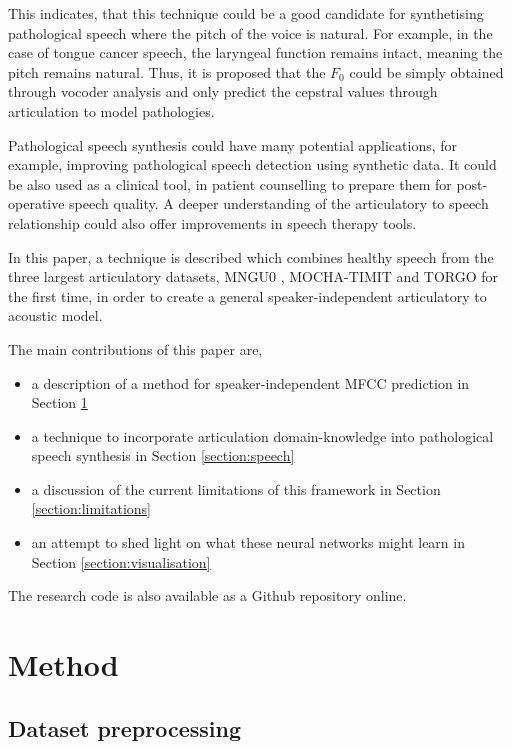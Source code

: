 \documentclass[a4paper]{article}
\begin{document}
This indicates, that this technique could be a good candidate for synthetising
pathological speech where the pitch of the voice is natural. For example,
in the case of tongue cancer speech, the laryngeal function remains intact,
meaning the pitch remains natural. Thus, it is proposed that the \( F_0 \) could
be simply obtained through vocoder analysis and only predict the cepstral
values through articulation to model pathologies.

Pathological speech synthesis could have many potential applications, for example, improving
pathological speech detection using synthetic data. It could be also used as a clinical tool,
in patient counselling to prepare them for post-operative speech quality. A deeper understanding
of the articulatory to speech relationship could also offer improvements in speech therapy tools.

In this paper, a technique is described which combines healthy speech
from the three largest articulatory datasets, MNGU0 \cite{Richmond2011},
MOCHA-TIMIT and TORGO \cite{Rudzicz2012} for the first time, in order to
create a general speaker-independent articulatory to acoustic model.

\vspace{0.5em}
The main contributions of this paper are,
\begin{itemize}
\setlength\itemsep{-0.3em}
\item a description of a method for speaker-independent MFCC prediction in Section \ref{section:method}
\item a technique to incorporate articulation domain-knowledge into pathological
  speech synthesis in Section \ref{section:speech} 
\item a discussion of the current limitations of this framework in Section \ref{section:limitations}
\item an attempt to shed light on what these neural networks might learn in Section \ref{section:visualisation}
\end{itemize}

The research code is also available as a Github repository online. \cite{Halpern2019}

\section{Method} \label{section:method}
\subsection{Dataset preprocessing}
\end{document}
